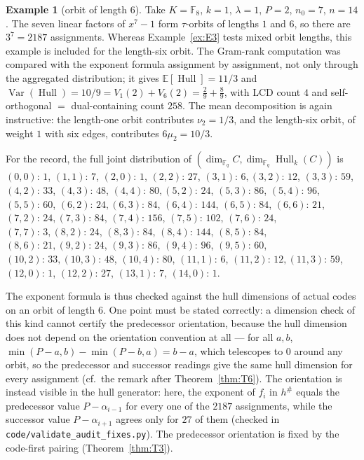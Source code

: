 \documentclass[11pt]{article}
\theoremstyle{definition}
\newtheorem{example}[theorem]{Example}
\theoremstyle{remark}
\newcommand{\Fq}{\mathbb{F}_q}
\newcommand{\Hull}{\operatorname{Hull}}
\newcommand{\E}{\mathbb{E}}
\begin{document}
\begin{example}[orbit of length \(6\)]\label{ex:E4}
Take \(K = \mathbb{F}_8\), \(k=1\), \(\lambda=1\), \(P=2\), \(n_0=7\),
\(n=14\). The seven linear factors of \(x^7-1\) form \(\tau\)-orbits
of lengths \(1\) and \(6\), so there are \(3^7 = 2187\) assignments.
Whereas Example~\ref{ex:E3} tests mixed orbit lengths, this example is
included for the length-six orbit. The Gram-rank computation was
compared with the exponent formula assignment by assignment, not only
through the aggregated distribution; it gives
\(\E[\Hull] = 11/3\) and
\(\operatorname{Var}(\Hull) = 10/9 = V_1(2) + V_6(2) = \tfrac29 +
\tfrac89\), with LCD count \(4\) and self-orthogonal \(=\) dual-containing
count \(258\). The mean decomposition is again instructive: the
length-one orbit contributes \(\nu_2 = 1/3\), and the length-six orbit,
of weight \(1\) with six edges, contributes \(6\mu_2 = 10/3\).

For the record, the full joint distribution of
\((\dim_{\Fq} C, \dim_{\Fq}\Hull_k(C))\) is
{\footnotesize
\((0,0){:}\,1\), \((1,1){:}\,7\), \((2,0){:}\,1\), \((2,2){:}\,27\), \((3,1){:}\,6,
(3,2){:}\,12\), \((3,3){:}\,59\), \((4,2){:}\,33\), \((4,3){:}\,48\), \((4,4){:}\,80,
(5,2){:}\,24\), \((5,3){:}\,86\), \((5,4){:}\,96\), \((5,5){:}\,60\), \((6,2){:}\,24,
(6,3){:}\,84\), \((6,4){:}\,144\), \((6,5){:}\,84\), \((6,6){:}\,21\), \((7,2){:}\,24,
(7,3){:}\,84\), \((7,4){:}\,156\), \((7,5){:}\,102\), \((7,6){:}\,24\), \((7,7){:}\,3,
(8,2){:}\,24\), \((8,3){:}\,84\), \((8,4){:}\,144\), \((8,5){:}\,84\), \((8,6){:}\,21,
(9,2){:}\,24\), \((9,3){:}\,86\), \((9,4){:}\,96\), \((9,5){:}\,60\), \((10,2){:}\,33,
(10,3){:}\,48\), \((10,4){:}\,80\), \((11,1){:}\,6\), \((11,2){:}\,12,
(11,3){:}\,59\), \((12,0){:}\,1\), \((12,2){:}\,27\), \((13,1){:}\,7\), \((14,0){:}\,1\).}

The exponent formula is thus checked against the hull dimensions of
actual codes on an orbit of length \(6\). One point must be stated
correctly: a dimension check of this kind cannot certify the predecessor
orientation, because the hull dimension does not depend on the
orientation convention at all --- for all \(a, b\),
\(\min(P-a,b) - \min(P-b,a) = b - a\), which telescopes to \(0\) around
any orbit, so the predecessor and successor readings give the same hull
dimension for every assignment (cf.\ the remark after
Theorem~\ref{thm:T6}). The orientation is instead visible in the hull
generator: here, the exponent of \(f_i\) in \(h^{\#}\) equals the
predecessor value \(P - \alpha_{i-1}\) for every one of the \(2187\)
assignments, while the successor value \(P - \alpha_{i+1}\) agrees only
for \(27\) of them (checked in
\texttt{code/validate\_audit\_fixes.py}). The predecessor orientation is
fixed by the code-first pairing (Theorem~\ref{thm:T3}).
\end{example}
\end{document}
